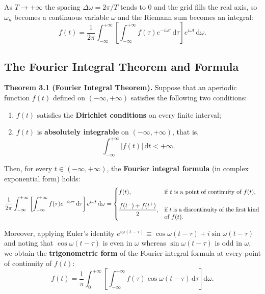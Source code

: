 \documentclass[11pt,a4paper]{article}
\theoremstyle{definition}
\theoremstyle{plain}
\begin{document}
As $T \to +\infty$ the spacing $\Delta\omega = 2\pi/T$ tends to $0$ and the grid fills the real axis, so $\omega_n$ becomes a continuous variable $\omega$ and the Riemann sum becomes an integral:
\begin{equation}
f(t) = \frac{1}{2\pi} \int_{-\infty}^{+\infty} \left[ \int_{-\infty}^{+\infty} f(\tau) e^{-i\omega \tau} \, \mathrm{d}\tau \right] e^{i\omega t} \, \mathrm{d}\omega.
\end{equation}

\subsection{The Fourier Integral Theorem and Formula}

\textbf{Theorem 3.1 (Fourier Integral Theorem).} Suppose that an aperiodic function $f(t)$ defined on $(-\infty, +\infty)$ satisfies the following two conditions:

\begin{enumerate}
\item $f(t)$ satisfies the \textbf{Dirichlet conditions} on every finite interval;
\item $f(t)$ is \textbf{absolutely integrable} on $(-\infty, +\infty)$, that is,
\begin{equation}
\int_{-\infty}^{+\infty} |f(t)| \, \mathrm{d}t < +\infty.
\end{equation}
\end{enumerate}

Then, for every $t \in (-\infty, +\infty)$, the \textbf{Fourier integral formula} (in complex exponential form) holds:
\begin{equation}
\frac{1}{2\pi} \int_{-\infty}^{+\infty} \left[ \int_{-\infty}^{+\infty} f(\tau) e^{-i\omega \tau} \, \mathrm{d}\tau \right] e^{i\omega t} \, \mathrm{d}\omega
=
\begin{cases}
f(t), & \parbox[t]{5.5cm}{if $t$ is a point of continuity of $f(t)$,}\\[10pt]
\dfrac{f(t^-) + f(t^+)}{2}, & \parbox[t]{5.5cm}{if $t$ is a discontinuity of the first kind of $f(t)$.}
\end{cases}
\end{equation}

Moreover, applying Euler's identity $e^{i\omega(t-\tau)} \equiv \cos\omega(t-\tau) + i\sin\omega(t-\tau)$ and noting that $\cos\omega(t-\tau)$ is even in $\omega$ whereas $\sin\omega(t-\tau)$ is odd in $\omega$, we obtain the \textbf{trigonometric form} of the Fourier integral formula at every point of continuity of $f(t)$:
\begin{equation}
f(t) = \frac{1}{\pi} \int_{0}^{+\infty} \left[ \int_{-\infty}^{+\infty} f(\tau) \cos\omega(t-\tau) \, \mathrm{d}\tau \right] \mathrm{d}\omega.
\end{equation}
\end{document}
